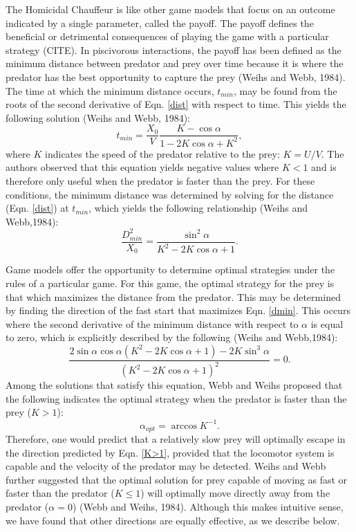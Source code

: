 \documentclass[12pt]{article}
\begin{document}
The Homicidal Chauffeur is like other game models that focus on an outcome indicated by a single parameter, called the payoff. The payoff defines the beneficial or detrimental consequences of playing the game with a particular strategy (CITE). In piscivorous interactions, the payoff has been defined as the minimum distance between predator and prey over time because it is where the predator has the best opportunity to capture the prey (Weihs and Webb, 1984). The time at which the minimum distance occurs, $t_{min}$, may be found from the roots of the second derivative of Eqn. \ref{dist} with respect to time. This yields the following solution (Weihs and Webb, 1984):
%
\begin{equation}
t_{min} = \frac{X_0}{V} \frac{K-\cos\alpha}{1-2 K\cos\alpha+K^2},
\label{eq33weihs}	
\end{equation}
%
where $K$ indicates the speed of the predator relative to the prey: $K = U/V$. The authors observed that this equation yields negative values where $K<1$ and is therefore only useful when the predator is faster than the prey. For these conditions, the minimum distance was determined by solving for the distance (Eqn. \ref{dist}) at $t_{min}$, which yields the following relationship (Weihs and Webb,1984):
%
\begin{equation}
\frac{D^2_{min}}{X_0} = \frac{\sin^2\alpha}{K^2 - 2K \cos\alpha + 1}.
\label{dmin}
\end{equation}

Game models offer the opportunity to determine optimal strategies under the rules of a particular game. For this game, the optimal strategy for the prey is that which maximizes the distance from the predator. This may be determined by finding the direction of the fast start that maximizes Eqn. \ref{dmin}. This occurs where the second derivative of the minimum distance with respect to $\alpha$ is equal to zero, which is explicitly described by the following (Weihs and Webb,1984):
%
\begin{equation}
\frac{2\sin\alpha \cos\alpha (K^2 -2 K \cos\alpha+1)-2 K \sin^3\alpha}{(K^2-2 K \cos\alpha + 1)^2} = 0. 
\label{eq37weihs}
\end{equation}
%
Among the solutions that satisfy this equation, Webb and Weihs proposed that the following indicates the optimal strategy when the predator is faster than the prey ($K > 1$):
%
\begin{equation}
\alpha_{opt} = \arccos K^{-1}. 
\label{K>1}
\end{equation}
%
Therefore, one would predict that a relatively slow prey will optimally escape in the direction predicted by Eqn. \ref{K>1}, provided that the locomotor system is capable and the velocity of the predator may be detected. Weihs and Webb further suggested that the optimal solution for prey capable of moving as fast or faster than the predator ($K\leq1$) will optimally move directly away from the predator ($\alpha = 0$) (Webb and Weihs, 1984). Although this makes intuitive sense, we have found that other directions are equally effective, as we describe below. 
\end{document}
